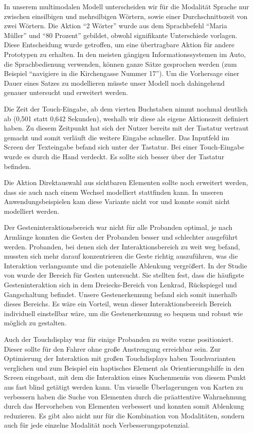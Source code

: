 In unserem multimodalen Modell unterscheiden wir für die Modalität Sprache nur zwischen einsilbigen und mehrsilbigen Wörtern, sowie einer Durchschnittszeit von zwei Wörtern. 
Die Aktion "`2 Wörter"' wurde aus dem Sprachbefehl "`Maria Müller"' und "`80 Prozent"'
gebildet, obwohl signifikante Unterschiede vorlagen. 
Diese Entscheidung wurde getroffen, um eine übertragbare Aktion für andere Prototypen zu erhalten.
In den meisten gängigen Informationssystemen im Auto, die Sprachbedienung verwenden, können ganze Sätze gesprochen werden (zum Beispiel "`navigiere in die Kirchengasse Nummer 17"'). 
Um die Vorhersage einer Dauer eines Satzes zu modellieren müsste unser Modell noch dahingehend genauer untersucht und erweitert werden. 

Die Zeit der Touch-Eingabe, ab dem vierten Buchstaben nimmt nochmal deutlich ab (0,501 statt 0,642 Sekunden), weshalb wir diese als eigene Aktionszeit definiert haben. 
Zu diesem Zeitpunkt hat sich der Nutzer bereits mit der Tastatur vertraut gemacht und somit  verläuft die weitere Eingabe schneller. 
Das Inputfeld im Screen der Texteingabe befand sich unter der Tastatur. 
Bei einer Touch-Eingabe wurde es durch die Hand verdeckt. 
Es sollte sich besser über der Tastatur befinden. 

Die Aktion Direktauswahl aus sichtbaren Elementen sollte noch erweitert werden, dass sie auch nach einem Wechsel modelliert stattfinden kann. 
In unseren Anwendungsbeispielen kam diese Variante nicht vor und konnte somit nicht modelliert werden.

Der Gesteninteraktionsbereich war nicht für alle Probanden optimal, je nach Armlänge konnten die Gesten der Probanden besser und schlechter ausgeführt werden. 
Probanden, bei denen sich der Interaktionsbereich zu weit weg befand, mussten sich mehr darauf konzentrieren die Geste richtig auszuführen, was die Interaktion verlangsamte und die potenzielle Ablenkung vergrößert. 
In der Studie von \citet{Riener:2013:SIG} wurde der Bereich für Gesten untersucht. 
Sie stellten fest, dass die häufigste Gesteninteraktion sich in dem Dreiecks-Bereich von Lenkrad, Rückspiegel und Gangschaltung befindet. 
Unsere Gestenerkennung befand sich somit innerhalb dieses Bereichs. 
Es wäre ein Vorteil, wenn dieser Interaktionsbereich Bereich individuell einstellbar wäre, um die Gestenerkennung so bequem und robust wie möglich zu gestalten.

Auch der Touchdisplay war für einige Probanden zu weite vorne positioniert. Dieser sollte für den Fahrer ohne große Anstrengung erreichbar sein.
Zur Optimierung der Interaktion mit großen Touchdisplays haben \citet{Rumelin:2013} Touchvarianten verglichen und zum Beispiel ein haptisches Element als Orientierungshilfe in den Screen eingebaut, mit dem die Interaktion eines Kuchenmenüs von diesem Punkt aus fast blind getätigt werden kann. 
Um visuelle Überlagerungen von Karten zu verbessern haben \citet{lee2013saliency} die Suche von Elementen durch die präattentive Wahrnehmung durch das Hervorheben von Elementen verbessert und konnten somit Ablenkung reduzieren. 
Es gibt also nicht nur für die Kombination von Modalitäten, sondern auch für jede einzelne Modalität noch Verbesserungspotenzial. 

